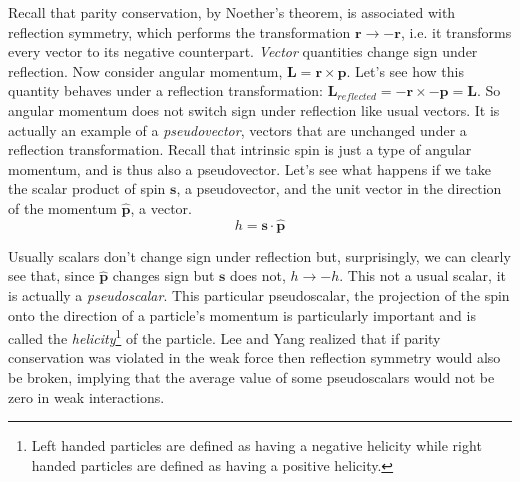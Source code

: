 \documentclass[a4paper,12pt]{book}
\begin{document}
Recall that parity conservation, by Noether's theorem, is associated with reflection symmetry, which performs the transformation $\mathbf{r}\longrightarrow -\mathbf{r}$, i.e. it transforms every vector to its negative counterpart. \emph{Vector} quantities change sign under reflection. Now consider angular momentum, $\mathbf{L}=\mathbf{r}\times \mathbf{p}$. Let's see how this quantity behaves under a reflection transformation: $\mathbf{L}_{reflected}=-\mathbf{r}\times -\mathbf{p}=\mathbf{L}$. So angular momentum does not switch sign under reflection like usual vectors. It is actually an example of a \emph{pseudovector}, vectors that are unchanged under a reflection transformation. Recall that intrinsic spin is just a type of angular momentum, and is thus also a pseudovector. Let's see what happens if we take the scalar product of spin $\mathbf{s}$, a pseudovector, and the unit vector in the direction of the momentum $\hat{\mathbf{p}}$, a vector.
\begin{equation}\label{helicity}
 h=\mathbf{s}\cdot \hat{\mathbf{p}}
\end{equation}

Usually scalars don't change sign under reflection but, surprisingly, we can clearly see that, since $\hat{\mathbf{p}}$ changes sign but $\mathbf{s}$ does not, $h\longrightarrow -h$. This not a usual scalar, it is actually a \emph{pseudoscalar}. This particular pseudoscalar, the projection of the spin onto the direction of a particle's momentum is particularly important and is called the \emph{helicity}\footnote{Left handed particles are defined as having a negative helicity while right handed particles are defined as having a positive helicity.} of the particle. Lee and Yang realized that if parity conservation was violated in the weak force then reflection symmetry would also be broken, implying that the average value of some pseudoscalars would not be zero in weak interactions.
\end{document}
